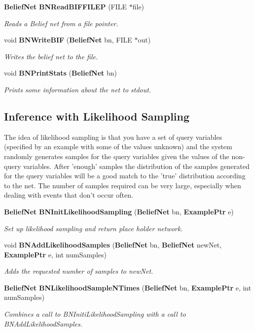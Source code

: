 \begin{CompactItemize}
{\bf Belief\-Net} {\bf BNRead\-BIFFILEP} (FILE $\ast$file)
\begin{CompactList}\small\item\em Reads a Belief net from a file pointer. \item\end{CompactList}\item 
void {\bf BNWrite\-BIF} ({\bf Belief\-Net} bn, FILE $\ast$out)
\begin{CompactList}\small\item\em Writes the belief net to the file. \item\end{CompactList}\item 
void {\bf BNPrint\-Stats} ({\bf Belief\-Net} bn)
\begin{CompactList}\small\item\em Prints some information about the net to stdout. \item\end{CompactList}\end{CompactItemize}
\subsection*{Inference with Likelihood Sampling}
The idea of likelihood sampling is that you have a set of query variables (specified by an example with some of the values unknown) and the system randomly generates samples for the query variables given the values of the non-query variables. After 'enough' samples the distribution of the samples generated for the query variables will be a good match to the 'true' distribution according to the net. The number of samples required can be very large, especially when dealing with events that don't occur often. \begin{CompactItemize}
\item 
{\bf Belief\-Net} {\bf BNInit\-Likelihood\-Sampling} ({\bf Belief\-Net} bn, {\bf Example\-Ptr} e)
\begin{CompactList}\small\item\em Set up likelihood sampling and return place holder network. \item\end{CompactList}\item 
void {\bf BNAdd\-Likelihood\-Samples} ({\bf Belief\-Net} bn, {\bf Belief\-Net} new\-Net, {\bf Example\-Ptr} e, int num\-Samples)
\begin{CompactList}\small\item\em Adds the requested number of samples to new\-Net. \item\end{CompactList}\item 
{\bf Belief\-Net} {\bf BNLikelihood\-Sample\-NTimes} ({\bf Belief\-Net} bn, {\bf Example\-Ptr} e, int num\-Samples)
\begin{CompactList}\small\item\em Combines a call to BNIniti\-Likelihood\-Sampling with a call to BNAdd\-Likelihood\-Samples. \item\end{CompactList}\end{CompactItemize}


